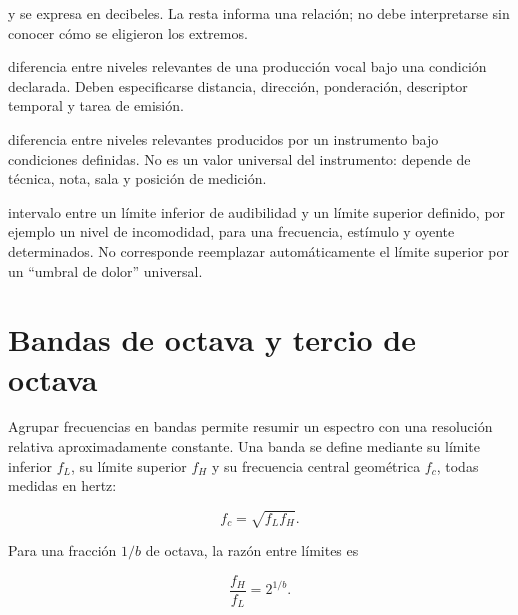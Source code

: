 y se expresa en decibeles. La resta informa una relación; no debe interpretarse
sin conocer cómo se eligieron los extremos.

\begin{description}[style=nextline]
    \item[\textbf{Rango dinámico vocal:}]
    diferencia entre niveles relevantes de una producción vocal bajo una
    condición declarada. Deben especificarse distancia, dirección,
    ponderación, descriptor temporal y tarea de emisión.

    \item[\textbf{Rango dinámico instrumental:}]
    diferencia entre niveles relevantes producidos por un instrumento bajo
    condiciones definidas. No es un valor universal del instrumento: depende
    de técnica, nota, sala y posición de medición.

    \item[\textbf{Rango dinámico auditivo:}]
    intervalo entre un límite inferior de audibilidad y un límite superior
    definido, por ejemplo un nivel de incomodidad, para una frecuencia,
    estímulo y oyente determinados. No corresponde reemplazar automáticamente
    el límite superior por un ``umbral de dolor'' universal.
\end{description}


\section{Bandas de octava y tercio de octava}
\label{sec:u5-bandas}

Agrupar frecuencias en bandas permite resumir un espectro con una resolución
relativa aproximadamente constante. Una banda se define mediante su límite
inferior \(f_L\), su límite superior \(f_H\) y su frecuencia central
geométrica \(f_c\), todas medidas en hertz:

\begin{equation}
    f_c=\sqrt{f_Lf_H}.
    \label{eq:u5-centro-geometrico}
\end{equation}

Para una fracción \(1/b\) de octava, la razón entre límites es

\begin{equation}
    \frac{f_H}{f_L}=2^{1/b}.
    \label{eq:u5-razon-banda}
\end{equation}


